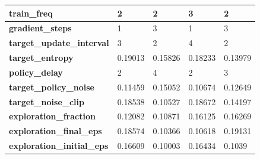 \documentclass[../xlapes02]{subfiles}
\begin{document}
\begin{table}[!ht]
\begin{tabular}{|l||l|l||l|l|}
            \textbf{train\_freq}               & 2                                            & 2                                            & 3                                            & 2                                            \\ \hline
            \textbf{gradient\_steps}           & 1                                            & 3                                            & 1                                            & 3                                            \\ \hline
            \textbf{target\_update\_interval}  & 3                                            & 2                                            & 4                                            & 2                                            \\ \hline
            \textbf{target\_entropy}           & 0.19013                                      & 0.15826                                      & 0.18233                                      & 0.13979                                      \\ \hline
            \textbf{policy\_delay}             & 2                                            & 4                                            & 2                                            & 3                                            \\ \hline
            \textbf{target\_policy\_noise}     & 0.11459                                      & 0.15052                                      & 0.10674                                      & 0.12649                                      \\ \hline
            \textbf{target\_noise\_clip}       & 0.18538                                      & 0.10527                                      & 0.18672                                      & 0.14197                                      \\ \hline
            \textbf{exploration\_fraction}     & 0.12082                                      & 0.10871                                      & 0.16125                                      & 0.16269                                      \\ \hline
            \textbf{exploration\_final\_eps}   & 0.18574                                      & 0.10366                                      & 0.10618                                      & 0.19131                                      \\ \hline
            \textbf{exploration\_initial\_eps} & 0.16609                                      & 0.10003                                      & 0.16434                                      & 0.1039                                       \\ \hline

\end{tabular}
\end{table}
\end{document}
